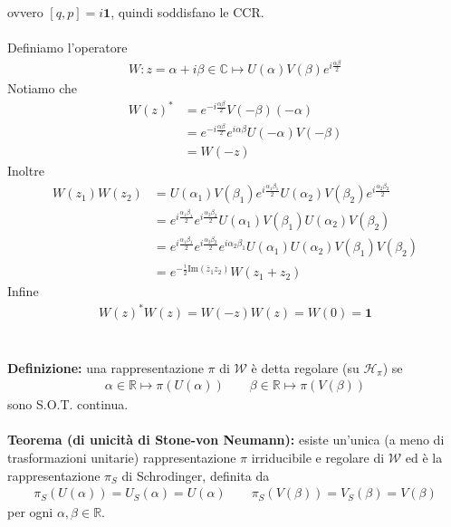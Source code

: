 \documentclass{article}
\numberwithin{equation}{subsection}
\begin{document}
ovvero $[q, p] = i\mathbf{1}$, quindi soddisfano le CCR. \\ \\
Definiamo l'operatore
\begin{align*}
    W : z = \alpha + i\beta \in \mathbb{C} \mapsto U(\alpha)V(\beta)e^{i\frac{\alpha\beta}{2}}
\end{align*}
Notiamo che
\begin{align*}
    W(z)^* &= e^{-i\frac{\alpha\beta}{2}}V(-\beta)(-\alpha) \\
    &= e^{-i\frac{\alpha\beta}{2}}e^{i\alpha\beta}U(-\alpha)V(-\beta) \\
    &= W(-z)
\end{align*}
Inoltre
\begin{align*}
    W(z_1)W(z_2) &= U(\alpha_1)V(\beta_1)e^{i\frac{\alpha_1\beta_1}{2}}U(\alpha_2)V(\beta_2)e^{i\frac{\alpha_2\beta_2}{2}} \\
    &= e^{i\frac{\alpha_1\beta_1}{2}}e^{i\frac{\alpha_2\beta_2}{2}}U(\alpha_1)V(\beta_1)U(\alpha_2)V(\beta_2) \\
    &= e^{i\frac{\alpha_1\beta_1}{2}}e^{i\frac{\alpha_2\beta_2}{2}}e^{i\alpha_2\beta_1}U(\alpha_1)U(\alpha_2)V(\beta_1)V(\beta_2) \\
    &= e^{-\frac{i}{2}\mathrm{Im}(\overline{z}_1z_2)}W(z_1 + z_2)
\end{align*}
Infine
\begin{align*}
    W(z)^*W(z) = W(-z)W(z) = W(0) = \mathbf{1}
\end{align*} \\ \\
\textbf{Definizione:} una rappresentazione $\pi$ di $\mathscr{W}$ è detta regolare (su $\mathcal{H}_\pi$) se
\begin{align*}
    \alpha \in \mathbb{R} \mapsto \pi(U(\alpha)) \qquad \beta \in \mathbb{R} \mapsto \pi(V(\beta))
\end{align*}
sono S.O.T. continua. \\ \\
\textbf{Teorema (di unicità di Stone-von Neumann):} esiste un'unica (a meno di trasformazioni unitarie) rappresentazione $\pi$ irriducibile e regolare di $\mathscr{W}$ ed è la rappresentazione $\pi_S$ di Schrodinger, definita da
\begin{align*}
    \pi_S(U(\alpha)) = U_S(\alpha) = U(\alpha) \qquad \pi_S(V(\beta)) = V_S(\beta) = V(\beta)
\end{align*}
per ogni $\alpha, \beta \in \mathbb{R}$. \\
\end{document}
